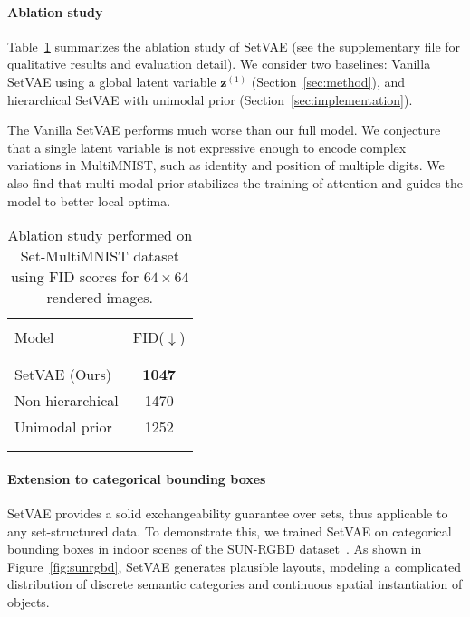 \documentclass[final]{arxiv/cvpr}
\newcommand{\cutparagraphup}{\vspace*{-0.1in}}
\begin{document}
\cutparagraphup
\paragraph{Ablation study}
Table~\ref{table:ablation} summarizes the ablation study of SetVAE (see the supplementary file for qualitative results and evaluation detail).
We consider two baselines: Vanilla SetVAE using a global latent variable $\mathbf{z}^{(1)}$ (Section~\ref{sec:method}), and hierarchical SetVAE with unimodal prior (Section~\ref{sec:implementation}).

The Vanilla SetVAE performs much worse than our full model.
We conjecture that a single latent variable is not expressive enough to encode complex variations in MultiMNIST, such as identity and position of multiple digits.
We also find that multi-modal prior stabilizes the training of attention and guides the model to better local optima.

\begin{table}[t!]
\begin{center}
\caption{Ablation study performed on Set-MultiMNIST dataset using FID scores for {$64\times 64$} rendered images.}
\vspace{-0.2cm}
\footnotesize
\label{table:ablation}
\begin{tabular}{lc}
\Xhline{2\arrayrulewidth}
\\[-1em] Model & FID($\downarrow$) \\
\\[-1em]\Xhline{2\arrayrulewidth}
\\[-1em]
SetVAE (Ours) & \textbf{1047} \\
Non-hierarchical & 1470 \\
Unimodal prior & 1252 \\
\\[-1em]\Xhline{2\arrayrulewidth}
\end{tabular}
\end{center}
\vspace{-0.4cm}
\end{table}

\cutparagraphup
\paragraph{Extension to categorical bounding boxes}
SetVAE provides a solid exchangeability guarantee over sets, thus applicable to any set-structured data.
To demonstrate this, we trained SetVAE on categorical bounding boxes in indoor scenes of the SUN-RGBD dataset~\cite{song2015sun}.
As shown in Figure~\ref{fig:sunrgbd}, SetVAE generates plausible layouts, modeling a complicated distribution of discrete semantic categories and continuous spatial instantiation of objects.
\end{document}
